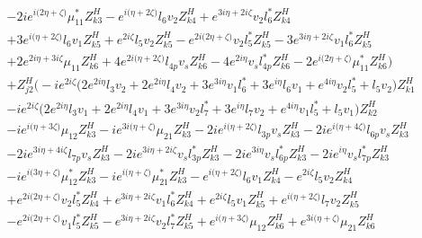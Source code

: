 \begin{align}
 &-2 i e^{i \Big(2 \eta +\zeta \Big)} \mu_{11}^* Z_{{k 3}}^{H} - e^{i \Big(\eta +2 \zeta \Big)} l_6 v_2 Z_{{k 4}}^{H} +e^{3 i \eta +2 i \zeta } v_2 l_6^* Z_{{k 4}}^{H} \nonumber \\ 
 &+3 e^{i \Big(\eta +2 \zeta \Big)} l_6 v_1 Z_{{k 5}}^{H} +e^{2 i \zeta } l_5 v_2 Z_{{k 5}}^{H} - e^{2 i \Big(2 \eta +\zeta \Big)} v_2 l_5^* Z_{{k 5}}^{H} -3 e^{3 i \eta +2 i \zeta } v_1 l_6^* Z_{{k 5}}^{H} \nonumber \\ 
 &+2 e^{2 i \eta +3 i \zeta } \mu_{11} Z_{{k 6}}^{H} +4 e^{2 i \Big(\eta +2 \zeta \Big)} l_{4p} v_s Z_{{k 6}}^{H} -4 e^{2 i \eta } v_s l_{4p}^* Z_{{k 6}}^{H} -2 e^{i \Big(2 \eta +\zeta \Big)} \mu_{11}^* Z_{{k 6}}^{H} \Big)\nonumber \\ 
 &+Z_{{j 2}}^{H} \Big(-i e^{2 i \zeta } \Big(2 e^{2 i \eta } l_3 v_2  + 2 e^{2 i \eta } l_4 v_2  + 3 e^{3 i \eta } v_1 l_6^*  + 3 e^{i \eta } l_6 v_1  + e^{4 i \eta } v_2 l_5^*  + l_5 v_2 \Big)Z_{{k 1}}^{H} \nonumber \\ 
 &-i e^{2 i \zeta } \Big(2 e^{2 i \eta } l_3 v_1  + 2 e^{2 i \eta } l_4 v_1  + 3 e^{3 i \eta } v_2 l_7^*  + 3 e^{i \eta } l_7 v_2  + e^{4 i \eta } v_1 l_5^*  + l_5 v_1 \Big)Z_{{k 2}}^{H} \nonumber \\ 
 &-i e^{i \Big(\eta +3 \zeta \Big)} \mu_{12} Z_{{k 3}}^{H} -i e^{3 i \Big(\eta +\zeta \Big)} \mu_{21} Z_{{k 3}}^{H} -2 i e^{i \Big(\eta +2 \zeta \Big)} l_{3p} v_s Z_{{k 3}}^{H} -2 i e^{i \Big(\eta +4 \zeta \Big)} l_{6p} v_s Z_{{k 3}}^{H} \nonumber \\ 
 &-2 i e^{3 i \eta +4 i \zeta } l_{7p} v_s Z_{{k 3}}^{H} -2 i e^{3 i \eta +2 i \zeta } v_s l_{3p}^* Z_{{k 3}}^{H} -2 i e^{3 i \eta } v_s l_{6p}^* Z_{{k 3}}^{H} -2 i e^{i \eta } v_s l_{7p}^* Z_{{k 3}}^{H} \nonumber \\ 
 &-i e^{i \Big(3 \eta +\zeta \Big)} \mu_{12}^* Z_{{k 3}}^{H} -i e^{i \Big(\eta +\zeta \Big)} \mu_{21}^* Z_{{k 3}}^{H} - e^{i \Big(\eta +2 \zeta \Big)} l_6 v_1 Z_{{k 4}}^{H} - e^{2 i \zeta } l_5 v_2 Z_{{k 4}}^{H} \nonumber \\ 
 &+e^{2 i \Big(2 \eta +\zeta \Big)} v_2 l_5^* Z_{{k 4}}^{H} +e^{3 i \eta +2 i \zeta } v_1 l_6^* Z_{{k 4}}^{H} +e^{2 i \zeta } l_5 v_1 Z_{{k 5}}^{H} +e^{i \Big(\eta +2 \zeta \Big)} l_7 v_2 Z_{{k 5}}^{H} \nonumber \\ 
 &- e^{2 i \Big(2 \eta +\zeta \Big)} v_1 l_5^* Z_{{k 5}}^{H} - e^{3 i \eta +2 i \zeta } v_2 l_7^* Z_{{k 5}}^{H} +e^{i \Big(\eta +3 \zeta \Big)} \mu_{12} Z_{{k 6}}^{H} +e^{3 i \Big(\eta +\zeta \Big)} \mu_{21} Z_{{k 6}}^{H} \nonumber \\ 

\end{align}
